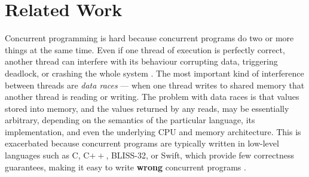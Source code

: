 \section{Related Work}
	
%


Concurrent programming is hard \cite{lea98,concurrentHard}
%
%
%
because concurrent programs do two or more things at the same
time. Even if one thread of execution is perfectly correct, another
thread can interfere with its behaviour corrupting data, triggering
deadlock, or crashing the whole system \cite{fonesca2010}.
%
%
The most important kind of interference between threads are
\textit{data races} --- when one thread writes to shared memory that
another thread is reading or writing. 
The problem with data races is
that values stored into memory, and the values returned by any reads,
may be essentially arbitrary, depending on the semantics of the
particular language, its implementation, and even the underlying CPU
and memory architecture.
%
This is exacerbated because concurrent programs are typically written in low-level languages
such as C, C$++$, BLISS-32, or Swift, which provide
few correctness guarantees, making it easy to write \textbf{wrong}
concurrent programs
\cite{CCppSCAM2014,lu2008learning}.
%
%
%
%
%

